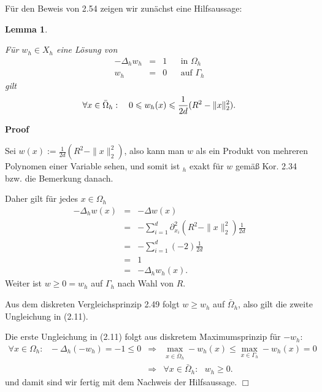 \documentclass{book}
\newcommand{\assign}{:=}
\newenvironment{proof}{\noindent\textbf{Proof\ }}{\hspace*{\fill}$\Box$\medskip}
\newtheorem{lemma}{Lemma}
\newcommand{\nonconverted}[1]{\mbox{}}
\begin{document}
F{\"u}r den Beweis von 2.54 zeigen wir zun{\"a}chst eine Hilfsaussage:

\begin{lemma}
  \
  
  F{\"u}r $w_h \in X_h$ eine L{\"o}sung von
  \[ \begin{array}{lllll}
       - \Delta_h w_h & = & 1 &  & \text{in } \Omega_h\\
       w_h & = & 0 &  & \text{auf } \Gamma_h
     \end{array} \]
  gilt
  \begin{equation}
    \forall x \in \bar{\Omega}_h : \text{\quad} 0 \leqslant w_h (x) \leqslant
    \frac{1}{2 d} (R^2 - \| x \|^2_2) .
  \end{equation}
\end{lemma}

\begin{proof}
  \
  
  Sei $w (x) \assign \frac{1}{2 d} (R^2 - \| x \|^2_2)$, also kann man $w$
  als ein Produkt von mehreren Polynomen einer Variable sehen, und somit ist
  $\nonconverted{bigtriangleup}_h$ exakt f{\"u}r $w$ gem{\"a}{\ss} Kor. 2.34
  bzw. die Bemerkung danach.
  
  Daher gilt f{\"u}r jedes $x \in \Omega_h$
  \begin{eqnarray*}
    - \Delta_h w (x) & = & - \Delta w (x)\\
    & = & - \sum_{i = 1}^d \partial^2_{x_i} (R^2 - \| x \|^2_2) \frac{1}{2
    d}\\
    & = & - \sum_{i = 1}^d (- 2)  \frac{1}{2 d}\\
    & = & 1\\
    & = & - \Delta_h w_h (x) .
  \end{eqnarray*}
  {\hspace{1.7em}}Weiter ist $w \geqslant 0 = w_h$ auf $\Gamma_h$ nach Wahl
  von $R$.
  
  Aus dem diskreten Vergleichsprinzip 2.49 folgt $w \geq w_h$ auf
  $\bar{\Omega}_h$, also gilt die zweite Ungleichung in (2.11).
  
  Die erste Ungleichung in (2.11) folgt aus diskretem Maximumsprinzip f{\"u}r
  $- w_h$:
  \begin{eqnarray*}
    \forall x \in \Omega_h : \text{ } - \Delta_h (- w_h) = - 1 \leqslant 0 &
    \Rightarrow & \max_{x \in \bar{\Omega}_h} - w_h (x) \leqslant \max_{x \in
    \Gamma_h} - w_h (x) = 0\\
    & \Rightarrow & \forall x \in \bar{\Omega}_h : \text{ } w_h \geqslant 0.
  \end{eqnarray*}
  und damit sind wir fertig mit dem Nachweis der Hilfsaussage.
\end{proof}
\end{document}
